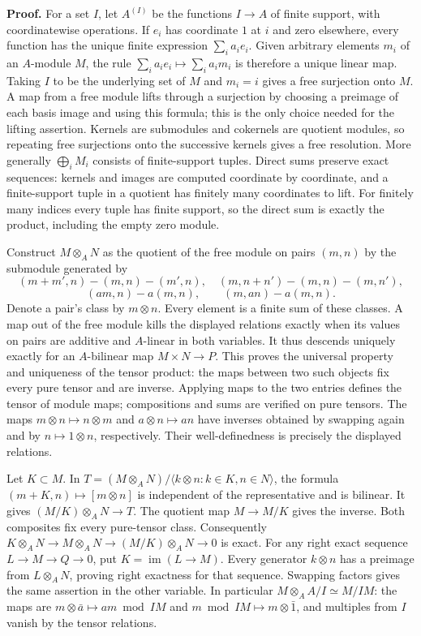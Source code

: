 \documentclass[11pt,a4paper,openany]{report}
\begin{document}
\textbf{Proof.} For a set \(I\), let \(A^{(I)}\) be the functions \(I\to A\) of finite support, with coordinatewise operations. If \(e_i\) has coordinate \(1\) at \(i\) and zero elsewhere, every function has the unique finite expression \(\sum_i a_ie_i\). Given arbitrary elements \(m_i\) of an \(A\)-module \(M\), the rule \(\sum_i a_ie_i\mapsto\sum_i a_im_i\) is therefore a unique linear map. Taking \(I\) to be the underlying set of \(M\) and \(m_i=i\) gives a free surjection onto \(M\). A map from a free module lifts through a surjection by choosing a preimage of each basis image and using this formula; this is the only choice needed for the lifting assertion. Kernels are submodules and cokernels are quotient modules, so repeating free surjections onto the successive kernels gives a free resolution. More generally \(\bigoplus_i M_i\) consists of finite-support tuples. Direct sums preserve exact sequences: kernels and images are computed coordinate by coordinate, and a finite-support tuple in a quotient has finitely many coordinates to lift. For finitely many indices every tuple has finite support, so the direct sum is exactly the product, including the empty zero module.

Construct \(M\otimes_A N\) as the quotient of the free module on pairs \((m,n)\) by the submodule generated by \[
(m+m',n)-(m,n)-(m',n),\quad (m,n+n')-(m,n)-(m,n'),
\] \[
(am,n)-a(m,n),\qquad (m,an)-a(m,n).
\] Denote a pair's class by \(m\otimes n\). Every element is a finite sum of these classes. A map out of the free module kills the displayed relations exactly when its values on pairs are additive and \(A\)-linear in both variables. It thus descends uniquely exactly for an \(A\)-bilinear map \(M\times N\to P\). This proves the universal property and uniqueness of the tensor product: the maps between two such objects fix every pure tensor and are inverse. Applying maps to the two entries defines the tensor of module maps; compositions and sums are verified on pure tensors. The maps \(m\otimes n\mapsto n\otimes m\) and \(a\otimes n\mapsto an\) have inverses obtained by swapping again and by \(n\mapsto1\otimes n\), respectively. Their well-definedness is precisely the displayed relations.

Let \(K\subset M\). In \(T=(M\otimes_A N)/\langle k\otimes n:k\in K,n\in N\rangle\), the formula \((m+K,n)\mapsto[m\otimes n]\) is independent of the representative and is bilinear. It gives \((M/K)\otimes_A N\to T\). The quotient map \(M\to M/K\) gives the inverse. Both composites fix every pure-tensor class. Consequently \(K\otimes_A N\to M\otimes_A N\to(M/K)\otimes_A N\to0\) is exact. For any right exact sequence \(L\to M\to Q\to0\), put \(K=\operatorname{im}(L\to M)\). Every generator \(k\otimes n\) has a preimage from \(L\otimes_A N\), proving right exactness for that sequence. Swapping factors gives the same assertion in the other variable. In particular \(M\otimes_A A/I\simeq M/IM\): the maps are \(m\otimes\bar a\mapsto am\bmod IM\) and \(m\bmod IM\mapsto m\otimes\bar1\), and multiples from \(I\) vanish by the tensor relations.
\end{document}
